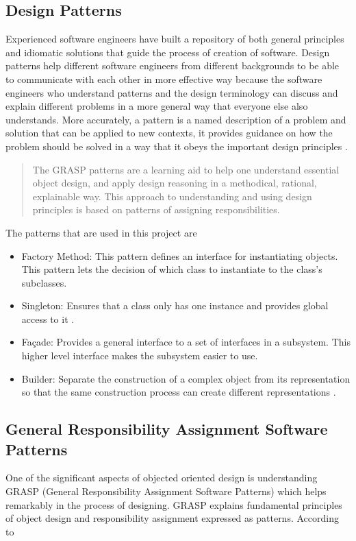 \documentclass[10pt, a4paper, titlepage]{article}
\begin{document}
\subsection{Design Patterns}
\label{Design_Patterns}
Experienced software engineers have built a repository of both general principles and idiomatic solutions that guide the process of creation of software. Design patterns help different software engineers from different backgrounds to be able to communicate with each other in more effective way because the software engineers who understand patterns and the design terminology can discuss and explain different problems in a more general way that everyone else also understands. More accurately, a pattern is a named description of a problem and solution that can be applied to new contexts, it provides guidance on how the problem should be solved in a way that it obeys the important design principles \cite{Larman_book}. 

\begin{quotation}
The GRASP patterns are a learning aid to help one understand essential object design, and apply design reasoning in a methodical, rational, explainable way. This approach to understanding and using design principles is based on patterns of assigning responsibilities.
\end{quotation}

The patterns that are used in this project are 
\begin{itemize}
\item Factory Method: This pattern defines an interface for instantiating objects. This pattern lets the decision of which class to instantiate to the class's subclasses.
\item Singleton: Ensures that a class only has one instance and provides global access to it \cite{Gof_book}. 
\item Façade: Provides a general interface to a set of interfaces in a subsystem. This higher level interface makes the subsystem easier to use.
\item Builder: Separate the construction of a complex object from its representation so that the same construction process can create different representations \cite{Gof_book}.

\end{itemize}

\subsection{General Responsibility Assignment Software Patterns}
\label{Grasp}
One of the significant aspects of objected oriented design is understanding GRASP (General Responsibility Assignment Software Patterns) which helps remarkably in the process of designing. GRASP explains fundamental principles of object design and responsibility assignment expressed as patterns. According to \cite{Larman_book}
\end{document}
